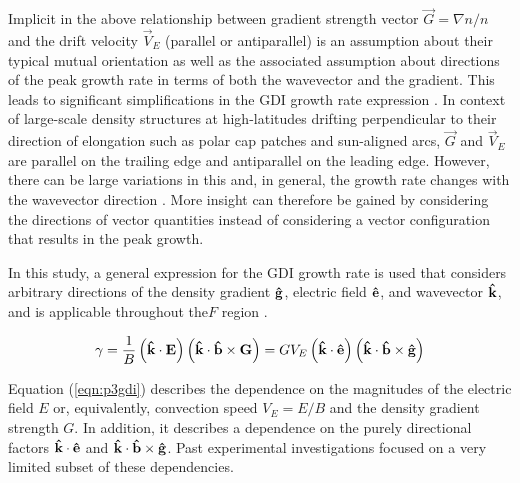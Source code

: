 Implicit in the above relationship  between gradient strength vector \(\vec{G} = \nabla n/n\) and the drift velocity \(\vec{V}_E\) (parallel or antiparallel) is an assumption about their typical mutual orientation as well as the associated assumption about directions of the peak growth rate in terms of both the wavevector and the gradient. This leads to significant simplifications in the GDI growth rate expression \citep{Linson1970,Tsunoda1988}. In context of large-scale density structures at high-latitudes drifting perpendicular to their direction of elongation \citep{Makarevitch2004c,Makarevich2015b} such as polar cap patches and sun-aligned arcs, \(\vec{G}\) and \(\vec{V}_E\) are parallel on the trailing edge and antiparallel on the leading edge. However, there can be large variations in this \citep{Makarevitch2004c} and, in general, the growth rate changes with the wavevector direction \citep{Keskinen1982a,Keskinen1983,Makarevich2014c}. More insight can therefore be gained by considering the directions of vector quantities instead of considering a vector configuration that results in the peak growth.

In this study, a general expression for the GDI growth rate is used that considers arbitrary directions of the density gradient \(\mathbf{\hat{g}}\), electric field \(\mathbf{\hat{e}}\), and wavevector \(\mathbf{\hat{k}}\), and is applicable throughout the\(F\) region \citep[Equation 23]{Makarevich2014c}.

\begin{equation}
  \label{eqn:p3gdi}
  \gamma = \frac{1}{B}\left(\mathbf{\hat{k}}\cdot\mathbf{E}\right)\left(\mathbf{\hat{k}}\cdot\mathbf{\hat{b}}\times\mathbf{G}\right) = GV_E\left(\mathbf{\hat{k}}\cdot\mathbf{\hat{e}}\right)\left(\mathbf{\hat{k}}\cdot\mathbf{\hat{b}}\times\mathbf{\hat{g}}\right)
\end{equation}

Equation (\ref{eqn:p3gdi}) describes the dependence on the magnitudes of the electric field $E$ or, equivalently, convection speed \(V_E=E/B\) and the density gradient strength \(G\). In addition, it describes a dependence on the purely directional factors \(\mathbf{\hat{k}}\cdot\mathbf{\hat{e}}\) and \(\mathbf{\hat{k}}\cdot\mathbf{\hat{b}}\times\mathbf{\hat{g}}\). Past experimental investigations focused on a very limited subset of these dependencies.

